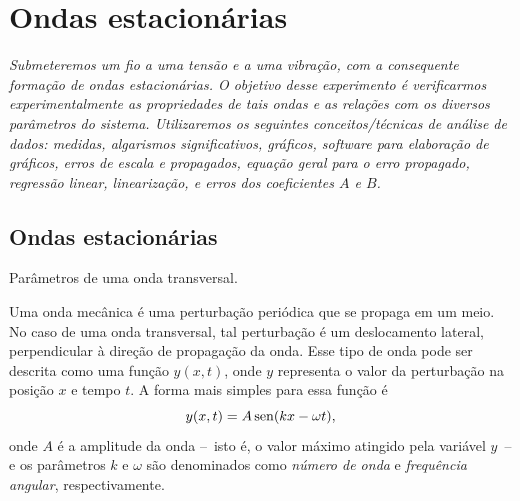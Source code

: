 \chapter{Ondas estacionárias}
\label{Chap:ExpOndasEstacionarias}

\begin{fullwidth}\it
Submeteremos um fio a uma tensão e a uma vibração, com a consequente formação de ondas estacionárias. O objetivo desse experimento é verificarmos experimentalmente as propriedades de tais ondas e as relações com os diversos parâmetros do sistema. Utilizaremos os seguintes conceitos/técnicas de análise de dados: medidas, algarismos significativos, gráficos, software para elaboração de gráficos, erros de escala e propagados, equação geral para o erro propagado, regressão linear, linearização, e erros dos coeficientes $A$ e $B$.
\end{fullwidth}

\section{Ondas estacionárias}

\begin{marginfigure}[5cm]
\centering
{}
\caption{Parâmetros de uma onda transversal.}
\label{Fig:OndaCongelada}
\end{marginfigure}

Uma onda mecânica é uma perturbação periódica que se propaga em um meio. No caso de uma onda transversal, tal perturbação é um deslocamento lateral, perpendicular à direção de propagação da onda. Esse tipo de onda pode ser descrita como uma função $y(x,t)$, onde $y$ representa o valor da perturbação na posição $x$ e tempo $t$. A forma mais simples para essa função é
\begin{equation}\label{Eq:OndaUnidimensional}
	y(x,t) = A \operatorname{sen}(kx - \omega t),
\end{equation}
%
onde $A$ é a amplitude da onda --~isto é, o valor máximo atingido pela variável $y$~-- e os parâmetros $k$ e $\omega$ são denominados como \emph{número de onda} e \emph{frequência angular}, respectivamente.

